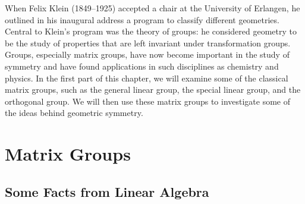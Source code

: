 
When Felix Klein (1849--1925) accepted a chair at
the University of Erlangen, he outlined in his inaugural address a
program to classify different geometries. Central to Klein's
program was the theory of groups: he considered geometry to be the
study of properties that are left invariant under transformation
groups. Groups, especially matrix groups, have now become important in
the study of symmetry and have found applications in such disciplines
as chemistry and physics. In the first part of this chapter, we will
examine some of the classical matrix groups, such as the general linear
group, the special linear group, and the orthogonal group. We will
then use these matrix groups to investigate some of the ideas behind
geometric symmetry.  


\section{Matrix Groups}

\subsection*{Some Facts from Linear Algebra}
 
